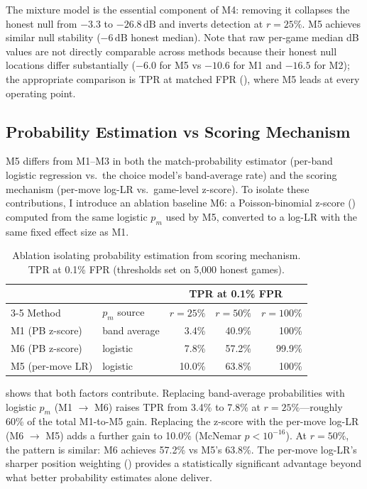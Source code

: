 \documentclass[11pt,a4paper]{article}
\newcommand{\dB}{\,\mathrm{dB}}
\theoremstyle{definition}
\begin{document}
The mixture model is the essential component of M4: removing it
collapses the honest null from $-3.3$ to $-26.8\dB$ and inverts
detection at $r = 25\%$.  M5 achieves similar null stability ($-6\dB$
honest median).  Note that raw per-game median dB values are not
directly comparable across methods because their honest null locations
differ substantially ($-6.0$ for M5 vs $-10.6$ for M1 and $-16.5$ for
M2); the appropriate comparison is TPR at matched FPR
(), where M5 leads at every
operating point.


\subsection{Probability Estimation vs Scoring Mechanism}
\label{sec:ablation-pb}

M5 differs from M1--M3 in both the match-probability estimator
(per-band logistic regression vs.\ the choice model's band-average
rate) and the scoring mechanism (per-move log-LR vs.\ game-level
z-score).  To isolate these contributions, I introduce an ablation
baseline M6: a Poisson-binomial z-score () computed
from the same logistic $p_m$ used by M5, converted to a log-LR with
the same fixed effect size as M1.

\begin{table}[t]
  \centering
  \caption{Ablation isolating probability estimation from scoring
    mechanism.  TPR at 0.1\% FPR (thresholds set on 5{,}000 honest
    games).}
  \label{tab:ablation-pb}
  \smallskip
  \small
  \begin{tabular}{@{}llrrr@{}}
    \toprule
    & & \multicolumn{3}{c}{TPR at 0.1\% FPR} \\
    \cmidrule(lr){3-5}
    Method & $p_m$ source & $r{=}25\%$ & $r{=}50\%$ & $r{=}100\%$ \\
    \midrule
    M1 (PB z-score)   & band average & 3.4\% & 40.9\% & 100\% \\
    M6 (PB z-score)   & logistic     & 7.8\% & 57.2\% & 99.9\% \\
    M5 (per-move LR)  & logistic     & 10.0\% & 63.8\% & 100\% \\
    \bottomrule
  \end{tabular}
\end{table}

 shows that both factors contribute.  Replacing
band-average probabilities with logistic $p_m$ (M1 $\to$ M6) raises
TPR from 3.4\% to 7.8\% at $r = 25\%$---roughly 60\% of the total
M1-to-M5 gain.  Replacing the z-score with the per-move log-LR
(M6 $\to$ M5) adds a further gain to 10.0\%
(McNemar $p < 10^{-16}$).  At $r = 50\%$, the pattern is similar:
M6 achieves 57.2\% vs M5's 63.8\%.  The per-move log-LR's sharper
position weighting () provides a statistically
significant advantage beyond what better probability estimates alone
deliver.
\end{document}
